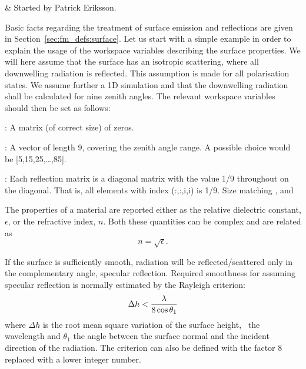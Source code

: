  \label{sec:surface}


 & Started by Patrick Eriksson. \\
\stophistory


Basic facts regarding the treatment of surface emission and
reflections are given in Section~\ref{sec:fm_defs:surface}.  Let us
start with a simple example in order to explain the usage of the
workspace variables describing the surface properties. We will here
assume that the surface has an isotropic scattering, where all
downwelling radiation is reflected. This assumption is made for all
polarisation states. We assume further a 1D simulation and that the
downwelling radiation shall be calculated for nine zenith angles. The
relevant workspace variables should then be set as follows:
  
 : A matrix (of correct size) of zeros.

 : A vector of length 9, covering the zenith
 angle range. A possible choice would be [5,15,25,\dots,85].
 
 : Each reflection matrix is a diagonal
 matrix with the value 1/9 throughout on the diagonal. That is, all
 elements with index (:,:,i,i) is 1/9. Size matching
 ,  and



 The properties of a material are reported either as the relative
 dielectric constant, $\epsilon$, or the refractive index, $n$. Both
 these quantities can be complex and are related as
 \begin{equation}
   \label{eq:rte_eps2n}
   n = \sqrt{\epsilon}.
 \end{equation}


 \label{sec:rte:surface:specular}
 
 If the surface is sufficiently smooth, radiation will be
 reflected/scattered only in the complementary angle, specular
 reflection. Required smoothness for assuming specular reflection is
 normally estimated by the Rayleigh criterion:
 \begin{equation}
   \label{eq:rte:rayleigh}
   \Delta h < \frac{\lambda}{8\cos\theta_1}
 \end{equation}
 where $\Delta h$ is the root mean square variation of the surface
 height, \Wvl\ the wavelength and $\theta_1$ the angle between the
 surface normal and the incident direction of the radiation. The
 criterion can also be defined with the factor 8 replaced with a lower
 integer number.
 
